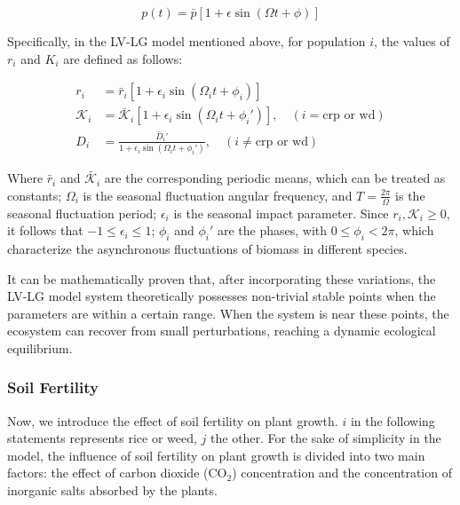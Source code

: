 \documentclass{HZNUMCM}
\begin{document}
        \begin{equation}
          p(t) = \bar{p} \left[ 1 + \epsilon \sin (\Omega t + \phi) \right]
        \end{equation}

        Specifically, in the LV-LG model mentioned above, 
        for population $i$, the values of $r_i$ and $K_i$ are defined as follows:

        \begin{align}
          r_i &= \bar{r}_i \left[ 1 + \epsilon_i \sin \left( \Omega_i t + \phi_i \right) \right] \\
          \mathscr{K}_i &= \bar{\mathscr{K}}_i \left[ 1 + \epsilon_i \sin \left( \Omega_i t + \phi_i' \right) \right], \quad \left( i = \text{crp or wd} \right) \\
          D_i &= \frac{\bar{D}_i'}{1 + \epsilon_i \sin \left( \Omega_i t + \phi_i' \right)}, \quad \left( i \neq \text{crp or wd} \right)
        \end{align}

        Where $\bar{r}_i$ and $\bar{\mathscr{K}}_i$ are the corresponding periodic means, 
        which can be treated as constants; $\Omega_i$ is the seasonal fluctuation angular frequency, 
        and $T = \frac{2\pi}{\Omega}$ is the seasonal fluctuation period; 
        $\epsilon_i$ is the seasonal impact parameter. Since $r_i, \mathscr{K}_i \geqslant 0$, 
        it follows that $-1 \leqslant \epsilon_i \leqslant 1$; $\phi_i$ and $\phi_i'$ are the phases, 
        with $0 \leqslant \phi_i < 2\pi$, which characterize the asynchronous fluctuations of biomass in different species.

        It can be mathematically proven that, after incorporating these variations, 
        the LV-LG model system theoretically possesses non-trivial stable points when the parameters are within a certain range. 
        When the system is near these points, the ecosystem can recover from small perturbations, 
        reaching a dynamic ecological equilibrium.
      \subsubsection{Soil Fertility}
        Now, we introduce the effect of soil fertility on plant growth.
        $i$ in the following statements represents rice or weed, $j$ the other.
        For the sake of simplicity in the model, 
        the influence of soil fertility on plant growth is divided into two main factors: 
        the effect of carbon dioxide (CO$_2$) concentration and the concentration of inorganic salts absorbed by the plants.
\end{document}

